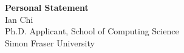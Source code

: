 \documentclass[11pt]{article}
\begin{document}
\begin{center}
    {\Large \textbf{Personal Statement}}\\[4pt]
    {\large Ian Chi}\\[2pt]
    Ph.D. Applicant, School of Computing Science\\
    Simon Fraser University
\end{center}

\vspace{1em}

\end{document}
